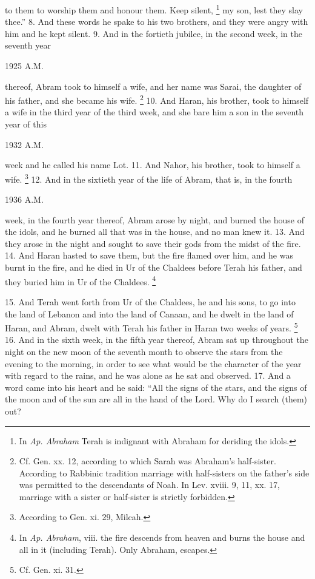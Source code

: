to them to worship them and honour them. Keep silent, \footnote{In \emph{Ap. Abraham} Terah is indignant with Abraham for deriding the idols.} my son, lest they slay thee.'' 8. And these words he spake to his two brothers, and they were angry with him and he kept silent. 9. And in the fortieth jubilee, in the second week, in the seventh year

1925 A.M.

thereof, Abram took to himself a wife, and her name was Sarai, the daughter of his father, and she became his wife. \footnote{Cf. Gen. xx. 12, according to which Sarah was Abraham's half-sister. According to Rabbinic tradition marriage with half-sisters on the father's side was permitted to the descendants of Noah. In Lev. xviii. 9, 11, xx. 17, marriage with a sister or half-sister is strictly forbidden.} 10. And Haran, his brother, took to himself a wife in the third year of the third week, and she bare him a son in the seventh year of this

1932 A.M.

week and he called his name Lot. 11. And Nahor, his brother, took to himself a wife. \footnote{According to Gen. xi. 29, Milcah.} 12. And in the sixtieth year of the life of Abram, that is, in the fourth

1936 A.M.

week, in the fourth year thereof, Abram arose by night, and burned the house of the idols, and he burned all that was in the house, and no man knew it. 13. And they arose in the night and sought to save their gods from the midst of the fire. 14. And Haran hasted to save them, but the fire flamed over him, and he was burnt in the fire, and he died in Ur of the Chaldees before Terah his father, and they buried him in Ur of the Chaldees. \footnote{In \emph{Ap. Abraham}, viii. the fire descends from heaven and burns the house and all in it (including Terah). Only Abraham, escapes.}


15. And Terah went forth from Ur of the Chaldees, he and his sons, to go into the land of Lebanon and into the land of Canaan, and he dwelt in the land of Haran, and Abram, dwelt with Terah his father in Haran two weeks of years. \footnote{Cf. Gen. xi. 31.} 16. And in the sixth week, in the fifth year thereof, Abram sat up throughout the night on the new moon of the seventh month to observe the stars from the evening to the morning, in order to see what would be the character of the year with regard to the rains, and he was alone as he sat and observed. 17. And a word came into his heart and he said: ``All the signs of the stars, and the signs of the moon and of the sun are all in the hand of the Lord. Why do I search (them) out?

